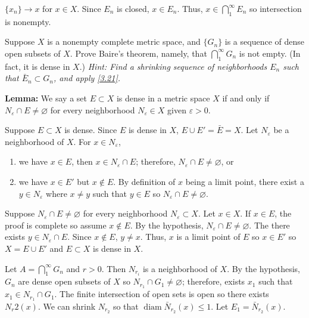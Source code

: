\begin{exercise}
  \(\{x_n\}\to x\) for \(x\in X\).
  Since \(E_n\) is closed, \(x\in E_n\).
  Thus, \(x\in\bigcap_1^{\infty}E_n\) so intersection is nonempty.
\item
  \label{3.22}
  Suppose \(X\) is a nonempty complete metric space, and \(\{G_n\}\) is a
  sequence of dense open subsets of \(X\).
  Prove Baire's theorem, namely, that \(\bigcap_1^{\infty}G_n\) is not empty.
  (In fact, it is dense in \(X\).)
  \textit{Hint: Find a shrinking sequence of neighborhoods \(E_n\) such that
    \(\bar{E}_n\subset G_n\), and apply \cref{3.21}.}
  \par\smallskip
  \textbf{Lemma:} We say a set \(E\subset X\) is dense in a metric space
  \(X\) if and only if \(N_{\varepsilon}\cap E\neq\varnothing\) for every
  neighborhood \(N_{\varepsilon}\in X\) given \(\varepsilon > 0\).
  \par\smallskip
  Suppose \(E\subset X\) is dense.
  Since \(E\) is dense in \(X\), \(E\cup E' = \bar{E} = X\).
  Let \(N_{\varepsilon}\) be a neighborhood of \(X\).
  For \(x\in N_{\varepsilon}\),
  \begin{enumerate}[label = \roman*.]
  \item
    we have \(x\in E\), then \(x\in N_{\varepsilon}\cap E\); therefore,
    \(N_{\varepsilon}\cap E\neq\varnothing\), or
  \item
    we have \(x\in E'\) but \(x\not\in E\).
    By definition of \(x\) being a limit point, there exist a
    \(y\in N_{\varepsilon}\) where \(x\neq y\) such that \(y\in E\) so
    \(N_{\varepsilon}\cap E\neq\varnothing\).
  \end{enumerate}
  Suppose \(N_{\varepsilon}\cap E\neq\varnothing\) for every neighborhood
  \(N_{\varepsilon}\subset X\).
  Let \(x\in X\).
  If \(x\in E\), the proof is complete so assume \(x\not\in E\).
  By the hypothesis, \(N_{\varepsilon}\cap E\neq\varnothing\).
  The there exists \(y\in N_{\varepsilon}\cap E\).
  Since \(x\not\in E\), \(y\neq x\).
  Thus, \(x\) is a limit point of \(E\) so \(x\in E'\) so \(X = E\cup E'\) and
  \(E\subset X\) is dense in \(X\).
  \par\smallskip
  Let \(A = \bigcap_1^{\infty}G_n\) and \(r > 0\).
  Then \(N_{r_i}\) is a neighborhood of \(X\).
  By the hypothesis, \(G_n\) are dense open subsets of \(X\) so
  \(N_{r_1}\cap G_1\neq\varnothing\); therefore, exists \(x_1\) such that
  \(x_1\in N_{r_1}\cap G_1\).
  The finite intersection of open sets is open so there exists \(N_r{2}(x)\).
  We can shrink \(N_{r_2}\) so that
  \(\operatorname{diam}\bar{N}_{r_2}(x)\leq 1\).
  Let \(E_1 = \bar{N}_{r_2}(x)\).

\end{exercise}
